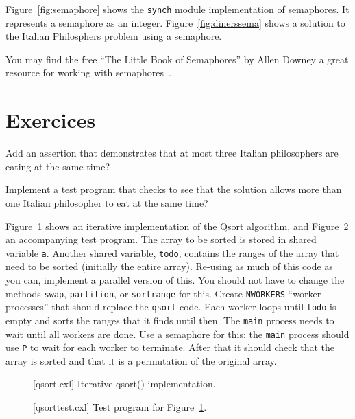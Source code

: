\documentclass{report}
\newenvironment{code}{
\tcolorbox
}{
\endtcolorbox
}
\begin{document}
Figure~\ref{fig:semaphore} shows the \texttt{synch} module implementation of
semaphores.
It represents a semaphore as an integer.
Figure~\ref{fig:dinerssema} shows a solution to the Italian Philosphers problem
using a semaphore.

You may find the free ``The Little Book of Semaphores'' by
Allen Downey a great resource for working with semaphores~\cite{Downey09}.

\section*{Exercices}
\begin{problems}
\item Add an assertion that demonstrates that at most three
Italian philosophers are eating at the same time?
\item Implement a test program that checks to see that
the solution allows more than one Italian philosopher to eat at the same time?
\item \label{ex:qsort}
Figure~\ref{fig:qsort} shows an iterative implementation of the Qsort
algorithm, and Figure~\ref{fig:qsorttest} an accompanying test program.
The array to be sorted is stored in  shared variable \texttt{a}.
Another shared variable, \texttt{todo}, contains the ranges of the
array that need to be sorted (initially the entire array).
Re-using as much of this code as you can, implement a parallel version of
this.  You should not have to change the methods \texttt{swap}, \texttt{partition},
or \texttt{sortrange} for this.  Create \texttt{NWORKERS} ``worker processes''
that should replace the \texttt{qsort} code.  Each worker loops until \texttt{todo}
is empty and sorts the ranges that it finds until then.  The \texttt{main}
process needs to wait until all workers are done.  Use a semaphore for this:
the \texttt{main} process should use \texttt{P} to wait for each
worker to terminate.  After that it should check that the array is sorted and
that it is a permutation of the original array.
\end{problems}

\begin{figure}
\begin{code}
\end{code}
\caption{[qsort.cxl] Iterative qsort() implementation.}
\label{fig:qsort}
\end{figure}

\begin{figure}
\begin{code}
\end{code}
\caption{[qsorttest.cxl] Test program for Figure~\ref{fig:qsort}.}
\label{fig:qsorttest}
\end{figure}
\end{document}
